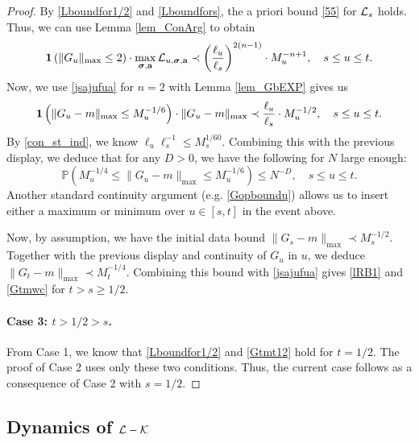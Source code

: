 \begin{proof}
By \eqref{Lboundfor1/2} and \eqref{Lboundfors}, the a priori bound \eqref{55} for \({\cal L}_s\) holds. Thus, we can use Lemma \ref{lem_ConArg} to obtain
\begin{equation}\label{jsajufua}
    {\bf 1}\left(\|G_{u}\|_{\max} \leq 2\right) \cdot \max_{\boldsymbol{\sigma}, \textbf{a}} {\cal L}_{u, \boldsymbol{\sigma}, \textbf{a}} \prec \left( \frac{\ell_u}{\ell_s} \right)^{2(n-1)} \cdot M_{u}^{-n+1}, \quad s \leq u \leq t.
\end{equation}
Now, we use \eqref{jsajufua} for $n=2$ with Lemma \ref{lem_GbEXP} gives us
$$
{\bf 1}\left(\|G_u - m\|_{\max} \leq M_{u}^{-1/6}\right) \cdot \|G_u - m\|_{\max} \prec \frac{\ell_u}{\ell_s} \cdot M_{u}^{-1/2}, \quad s \leq u \leq t.
$$
By \eqref{con_st_ind}, we know $\ell_{u}\ell_{s}^{-1}\leq M_{s}^{1/60}$. Combining this with the previous display, we deduce that for any $D>0$, we have the following for $N$ large enough:
\begin{equation}
    \mathbb{P}\left(M_{u}^{-1/4} \leq \|G_u - m\|_{\max} \leq M_{u}^{-1/6}\right) \leq N^{-D}, \quad s \leq u \leq t.
\end{equation}
Another standard continuity argument (e.g. \eqref{Gopboundu}) allows us to insert either a maximum or minimum over $u\in[s,t]$ in the event above. 

Now, by assumption, we have the initial data bound $\|G_s - m\|_{\max} \prec M_{s}^{-1/2}$. Together with the previous display and continuity of $G_{u}$ in $u$, we deduce $\|G_t - m\|_{\max} \prec M_{t}^{-1/4}$. Combining this bound with \eqref{jsajufua} gives \eqref{lRB1} and \eqref{Gtmwc} for $t>s\geq1/2$.

\paragraph{Case 3: \(t > 1/2 > s\).} From Case 1, we know that \eqref{Lboundfor1/2} and \eqref{Gtmt12} hold for \(t = 1/2\). The proof of Case 2 uses only these two conditions. Thus, the current case follows as a consequence of Case 2 with \(s = 1/2\).
\end{proof}



\subsection{Dynamics of  \texorpdfstring{$\cal L-\cal K$}{L-K}}


